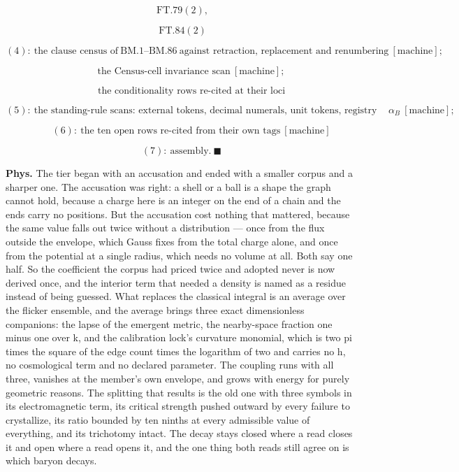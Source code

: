 \documentclass[11pt,openany]{report}
\theoremstyle{canonplain}
\theoremstyle{canondef}
\begin{document}
\[
\ \mathrm{FT.79}(2),
\]

\[
\ \mathrm{FT.84}(2)
\]

\[
(4):\ \text{the clause census of}\ \mathrm{BM.1}\text{--}\mathrm{BM.86}\ \text{against retraction, replacement and renumbering}\ [\text{machine}];
\]

\[
\qquad \text{the Census-cell invariance scan}\ [\text{machine}];
\]

\[
\qquad \text{the conditionality rows re-cited at their loci}
\]

\[
(5):\ \text{the standing-rule scans: external tokens, decimal numerals, unit tokens, registry tokens, declaration lines, the barred object}\ \alpha_B\ [\text{machine}];
\]

\[
\qquad (6):\ \text{the ten open rows re-cited from their own tags}\ [\text{machine}]
\]

\[
(7):\ \text{assembly}.\ \blacksquare
\]

\textbf{Phys.} The tier began with an accusation and ended with a smaller corpus and a sharper one. The accusation was right: a shell or a ball is a shape the graph cannot hold, because a charge here is an integer on the end of a chain and the ends carry no positions. But the accusation cost nothing that mattered, because the same value falls out twice without a distribution — once from the flux outside the envelope, which Gauss fixes from the total charge alone, and once from the potential at a single radius, which needs no volume at all. Both say one half. So the coefficient the corpus had priced twice and adopted never is now derived once, and the interior term that needed a density is named as a residue instead of being guessed. What replaces the classical integral is an average over the flicker ensemble, and the average brings three exact dimensionless companions: the lapse of the emergent metric, the nearby-space fraction one minus one over k, and the calibration lock's curvature monomial, which is two pi times the square of the edge count times the logarithm of two and carries no h, no cosmological term and no declared parameter. The coupling runs with all three, vanishes at the member's own envelope, and grows with energy for purely geometric reasons. The splitting that results is the old one with three symbols in its electromagnetic term, its critical strength pushed outward by every failure to crystallize, its ratio bounded by ten ninths at every admissible value of everything, and its trichotomy intact. The decay stays closed where a read closes it and open where a read opens it, and the one thing both reads still agree on is which baryon decays.
\end{document}
